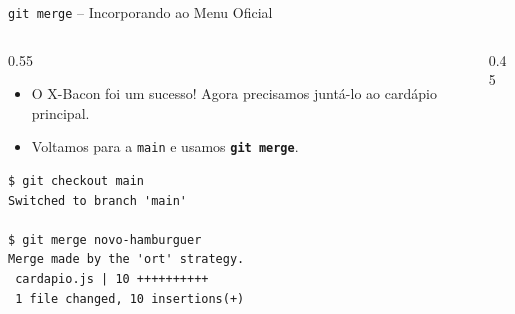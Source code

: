\documentclass[aspectratio=169]{beamer}
\begin{document}
\begin{frame}[fragile]{\texttt{git merge} -- Incorporando ao Menu Oficial}
    \begin{columns}
        \begin{column}{0.55\textwidth}
            \begin{itemize}
                \item O X-Bacon foi um sucesso! Agora precisamos juntá-lo ao cardápio principal.
                \item Voltamos para a \texttt{main} e usamos \textbf{\texttt{git merge}}.
            \end{itemize}
\begin{lstlisting}[basicstyle=\ttfamily\tiny]
$ git checkout main
Switched to branch 'main'

$ git merge novo-hamburguer
Merge made by the 'ort' strategy.
 cardapio.js | 10 ++++++++++
 1 file changed, 10 insertions(+)
\end{lstlisting}
        \end{column}
        \begin{column}{0.45\textwidth}
            \begin{center}
            \end{center}
        \end{column}
    \end{columns}
\end{frame}
\end{document}
